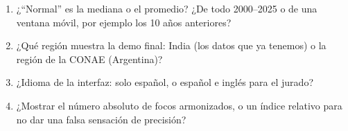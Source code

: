 \documentclass[11pt,a4paper]{article}
\begin{document}
\begin{enumerate}
  \item ¿``Normal'' es la mediana o el promedio? ¿De todo 2000--2025 o de una ventana
        móvil, por ejemplo los 10 años anteriores?
  \item ¿Qué región muestra la demo final: India (los datos que ya tenemos) o la región
        de la CONAE (Argentina)?
  \item ¿Idioma de la interfaz: solo español, o español e inglés para el jurado?
  \item ¿Mostrar el número absoluto de focos armonizados, o un índice relativo para no
        dar una falsa sensación de precisión?
\end{enumerate}
\end{document}
